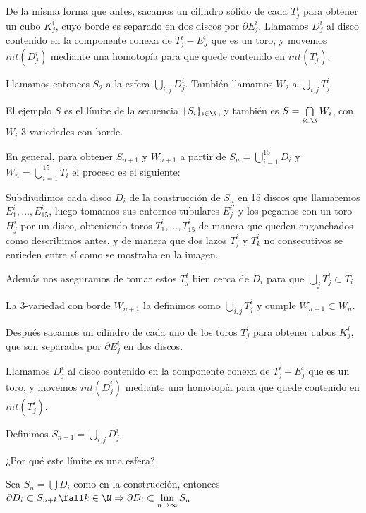 De la misma forma que antes, sacamos un cilindro sólido de cada $T^i_j$ para obtener un cubo $K^i_j$, cuyo borde es separado en dos discos por $\partial E^i_j$. Llamamos $D^i_j$ al disco contenido en la componente conexa de $T^i_j-E^i_J$ que es un toro, y movemos $int(D_j^i)$ mediante una homotopía para que quede contenido en $int(T_j^i)$. 

Llamamos entonces $S_2$ a la esfera $\bigcup\limits_{i,j} D^i_j$. También llamamos $W_2$ a $\bigcup\limits_{i,j}T^i_j$ 

El ejemplo $S$ es el límite de la secuencia $\{S_i\}_{i\in\N}$, y también es $S=\bigcap\limits_{i\in\N}W_i$, con $W_i$ 3-variedades con borde. 

En general, para obtener $S_{n+1}$ y $W_{n+1}$ a partir de $S_n=\bigcup\limits_{i=1}^{15}D_i$ y $W_n=\bigcup\limits_{i=1}^{15}T_i$ el proceso es el siguiente: 
            
Subdividimos cada disco $D_i$ de la construcción de $S_n$ en 15 discos que llamaremos $E^i_1,\dots, E^i_{15}$, luego tomamos sus entornos tubulares $E^{i'}_{j}$ y los pegamos con un toro $H_j^i$ por un disco, obteniendo toros $T^i_1,\dots,T^i_{15}$ de manera que queden enganchados como describimos antes, y de manera que dos lazos $T_j^i$ y $T_k^i$ no consecutivos se enrieden entre sí como se mostraba en la imagen. 
            
Además nos aseguramos de tomar estos $T_j^i$ bien cerca de $D_i$ para que $\bigcup\limits_{j} T^i_j\subset T_i$

La 3-variedad con borde $W_{n+1}$ la definimos como $\bigcup\limits_{i,j} T_j^i$ y cumple $W_{n+1}\subset W_n$. 

Después sacamos un cilindro de cada uno de los toros $T_j^i$ para obtener cubos $K_j^i$, que son separados por $\partial E_j^i$ en dos discos. 

Llamamos $D_j^i$ al disco contenido en la componente conexa de $T_j^i - E_j^i$ que es un toro, y movemos $int(D_j^i)$ mediante una homotopía para que quede contenido en $int(T_j^i)$. 

Definimos $S_{n+1} = \bigcup\limits_{i,j} D_j^i$. 

¿Por qué este límite es una esfera?

Sea $S_n=\bigcup D_i$ como en la construcción, entonces $\partial D_i\subset S_{n+k} \fall k\in\N \Rightarrow \partial D_i\subset \lim\limits_{n\to\infty} S_n$ 

